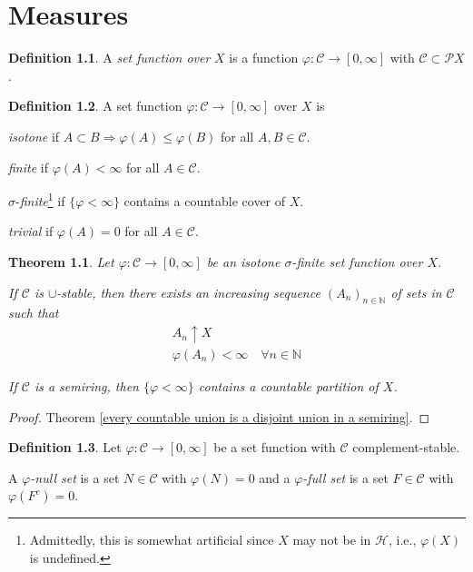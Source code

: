 \documentclass[11pt, a4paper, openany]{book}
\newtheorem{thm}{Theorem}\newtheorem{lem}{Lemma}\newtheorem{crl}{Corollary}
\theoremstyle{definition}
\newtheorem{define}{Definition}\newtheorem{exam}{Example}\newtheorem{remark}{Remark}
\newenvironment{tight_enumerate}{\begin{enumerate}\itemsep -0.2em}{\end{enumerate}}
\begin{document}
\chapter{Measures}
    \begin{define}
        A \textit{set function over }$X$ is a function $\varphi:\mathscr{C}\rightarrow [0,\infty]$ with $\mathscr{C}\subset \mathscr{P}X$.
    \end{define}
    \begin{define}
        A set function $\varphi:\mathscr{C}\rightarrow [0,\infty]$ over $X$ is
        \begin{tight_enumerate}
            \item \textit{isotone} if $A\subset B\Rightarrow \varphi(A)\leqslant \varphi(B)$ for all $A,B\in\mathscr{C}$.
            \item \textit{finite} if $\varphi(A)<\infty$ for all $A\in\mathscr{C}$.
            \item $\sigma$-\textit{finite}\footnote{Admittedly, this is somewhat artificial since $X$ may not be in $\mathscr{H}$, i.e., $\varphi(X)$ is undefined.} if $\{\varphi<\infty\}$ contains a countable cover of $X$.
            \item \textit{trivial} if $\varphi(A)=0$ for all $A\in\mathscr{C}$.
        \end{tight_enumerate}
    \end{define}
    \begin{thm}
        Let $\varphi:\mathscr{C}\rightarrow [0,\infty]$ be an isotone $\sigma$-finite set function over $X$.
    
        If $\mathscr{C}$ is $\cup$-stable, then there exists an increasing sequence $(A_n)_{n\in\mathbb{N}}$ of sets in $\mathscr{C}$ such that
        \begin{gather*}
            A_n\uparrow X\\
            \varphi(A_n)<\infty\quad\forall n\in\mathbb{N}
        \end{gather*}

        If $\mathscr{C}$ is a semiring, then $\{\varphi<\infty\}$ contains a countable partition of $X$. 
    \end{thm}
    \begin{proof}
        Theorem \ref{every countable union is a disjoint union in a semiring}.
    \end{proof}
    \begin{define}
        Let $\varphi:\mathscr{C}\rightarrow [0,\infty]$ be a set function with $\mathscr{C}$ complement-stable. 
        
        A $\varphi$\textit{-null set} is a set $N\in\mathscr{C}$ with $\varphi(N)=0$ and a $\varphi$\textit{-full set} is a set $F\in\mathscr{C}$ with $\varphi(F^c)=0$.
    \end{define}
\end{document}
